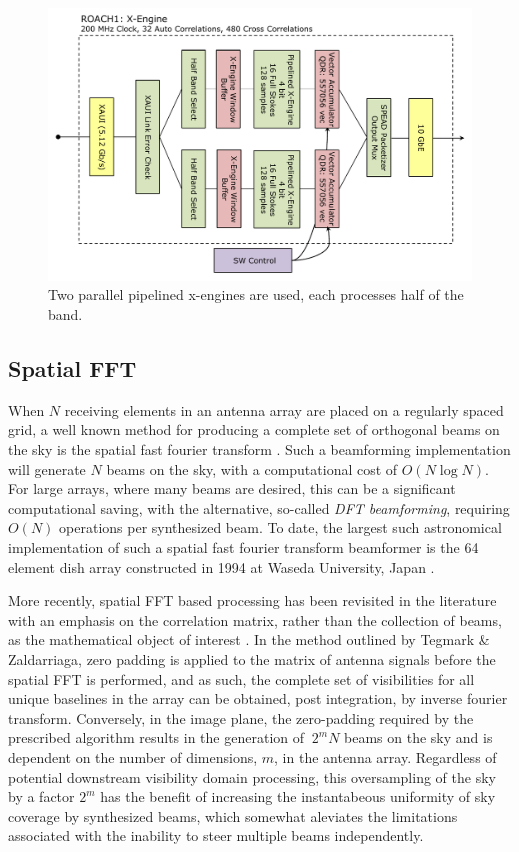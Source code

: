 \documentclass[useAMS,macros,usenatbib,onecolumn]{mn2e}
\begin{document}
\begin{figure}
    \centering
    \includegraphics[scale=0.6]{graphics/crop_xengine_block.pdf}
    \caption{Two parallel pipelined x-engines are used, each processes half of the band.}
    \label{fig:xeng_block}
\end{figure}

\subsection{Spatial FFT}
\label{s-engine}
 
When $N$ receiving elements in an antenna array are placed on a regularly spaced grid, a well known method for producing a complete set of orthogonal beams on the sky is the spatial fast fourier transform \citep{fastbeamforming}.
Such a beamforming implementation will generate $N$ beams on the sky, with a computational cost of $O(N\log{N})$. For large arrays, where many beams are desired, this can be a significant computational saving, with the alternative, so-called \emph{DFT beamforming}, requiring $O(N)$ operations per synthesized beam.
To date, the largest such astronomical implementation of such a spatial fast fourier transform beamformer is the 64 element dish array constructed in 1994 at Waseda University, Japan \citep{2dfft}.

More recently, spatial FFT based processing has been revisited in the literature with an emphasis on the correlation matrix, rather than the collection of beams, as the mathematical object of interest \citep{fftt} \citep{omniscope}.
In the method outlined by Tegmark \& Zaldarriaga, zero padding is applied to the matrix of antenna signals before the spatial FFT is performed, and as such, the complete set of visibilities for all unique baselines in the array can be obtained, post integration, by inverse fourier transform.
Conversely, in the image plane, the zero-padding required by the prescribed algorithm results in the generation of $~2^{m}N$ beams on the sky and is dependent on the number of dimensions, $m$, in the antenna array.
Regardless of potential downstream visibility domain processing, this oversampling of the sky by a factor $2^{m}$ has the benefit of increasing the instantabeous uniformity of sky coverage by synthesized beams, which somewhat aleviates the limitations associated with the inability to steer multiple beams independently.
\end{document}
